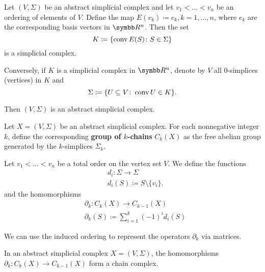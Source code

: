 \begin{proposition}\label{thm:abstract_simplicial_complex_iff_simplicial_complex}
  Let \( (V, \Sigma) \) be an abstract simplicial complex and let \( v_1 < \ldots < v_n \) be an ordering of elements of \( V \). Define the map \( E(v_k) \coloneqq e_k, k = 1, \ldots, n \), where \( e_k \) are the corresponding basis vectors in \( \BB{R^n} \). Then the set
  \begin{equation*}
    K \coloneqq \{ \operatorname{conv} E(S) \colon S \in \Sigma \}
  \end{equation*}
  is a simplicial complex.

  Conversely, if \( K \) is a simplicial complex in \( \BB{R^n} \), denote by \( V \) all \( 0 \)-simplices (vertices) in \( K \) and
  \begin{equation*}
    \Sigma \coloneqq \{ U \subseteq V \colon \operatorname{conv} U \in K \}.
  \end{equation*}

  Then \( (V, \Sigma) \) is an abstract simplicial complex.
\end{proposition}

\begin{definition}\label{def:group_of_chains}\cite[262]{Carlsson2009}
  Let \( X = (V, \Sigma) \) be an abstract simplicial complex. For each nonnegative integer \( k \), define the corresponding \textbf{group of \( k \)-chains} \( C_k(X) \) as the free abelian group generated by the \( k \)-simplices \( \Sigma_k \).

  Let \( v_1 < \ldots < v_n \) be a total order on the vertex set \( V \). We define the functions
  \begin{align*}
    &d_i: \Sigma \to \Sigma \\
    &d_i(S) \coloneqq S \setminus \{ v_i \}.
  \end{align*}
  and the homomorphisms
  \begin{align*}
    &\partial_k: C_k(X) \to C_{k-1}(X) \\
    &\partial_k(S) \coloneqq \sum_{i=1}^k (-1)^i d_i(S)
  \end{align*}

  We can use the induced ordering to represent the operators \( \partial_k \) via matrices.
\end{definition}

\begin{proposition}\label{def:abstract_simplicial_chain_complex}
  In an abstract simplicial complex \( X = (V, \Sigma) \), the homomorphisms \( \partial_k: C_k(X) \to C_{k-1}(X) \) form a chain complex.
\end{proposition}
